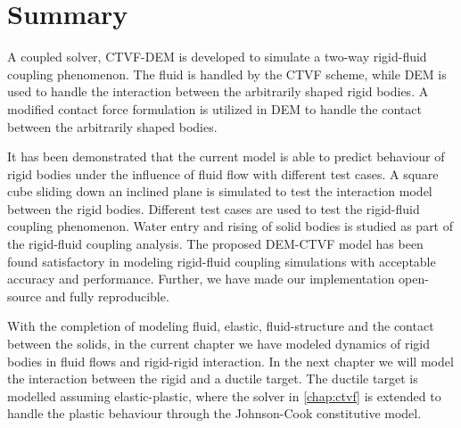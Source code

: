 



\FloatBarrier%
\section{Summary}
\label{sec:Summary}
A coupled solver, CTVF-DEM is developed to simulate a two-way rigid-fluid
coupling phenomenon. The fluid is handled by the CTVF scheme, while DEM is
used to handle the interaction between the arbitrarily shaped rigid bodies. A
modified contact force formulation is utilized in DEM to handle the contact
between the arbitrarily shaped bodies.

It has been demonstrated that the current model is able to predict behaviour of
rigid bodies under the influence of fluid flow with different test cases. A
square cube sliding down an inclined plane is simulated to test the interaction
model between the rigid bodies. Different test cases are used to test the
rigid-fluid coupling phenomenon. Water entry and rising of solid bodies is
studied as part of the rigid-fluid coupling analysis.
The proposed DEM-CTVF model has been found satisfactory in modeling rigid-fluid
coupling simulations with acceptable accuracy and performance. Further, we have
made our implementation open-source and fully reproducible.

With the completion of modeling fluid, elastic, fluid-structure and the contact
between the solids, in the current chapter we have modeled dynamics of rigid
bodies in fluid flows and rigid-rigid interaction. In the next chapter we will
model the interaction between the rigid and a ductile target. The ductile target
is modelled assuming elastic-plastic, where the solver in \cref{chap:ctvf} is
extended to handle the plastic behaviour through the Johnson-Cook constitutive
model.

